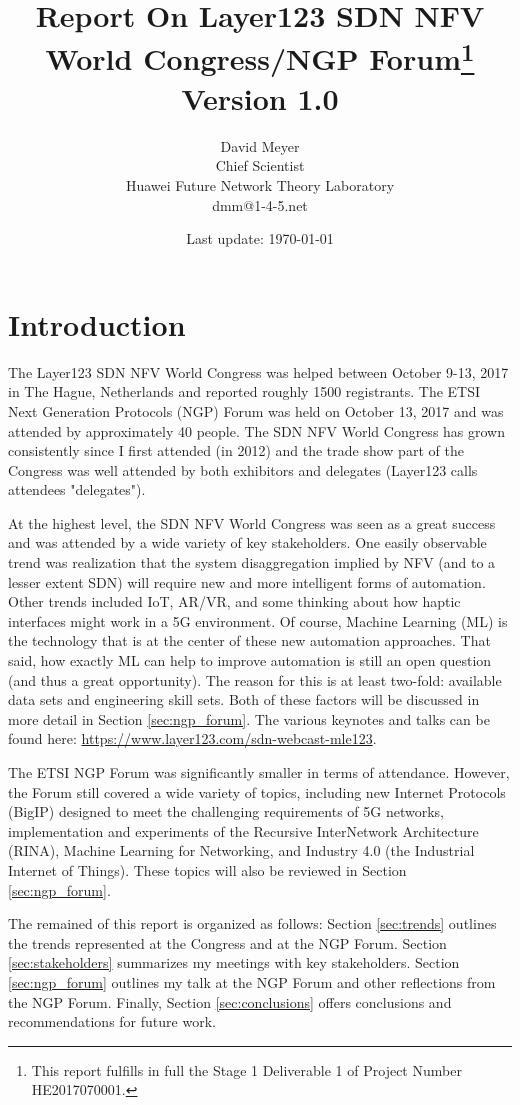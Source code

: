 \documentclass[11pt, oneside]{article}   	%
\title{Report On Layer123 SDN NFV World Congress/NGP Forum\footnote{This report fulfills in full the Stage 1 Deliverable 1 of Project Number HE2017070001.}
Version 1.0}
\author{David Meyer \\
Chief Scientist \\
Huawei Future Network Theory Laboratory \\
dmm@1-4-5.net}
\date{Last update: \today}							%
\begin{document}
\maketitle

\section{Introduction} 
\label{sec:intro}
The Layer123 SDN NFV World Congress was helped between October 9-13, 2017 in The Hague, Netherlands and reported roughly 1500 registrants. The ETSI Next Generation Protocols (NGP) Forum was held on October 13, 2017 and was attended by approximately 40 people. The SDN NFV World Congress has grown consistently since I first attended (in 2012) and the trade show part of the Congress was well attended by both exhibitors and delegates (Layer123 calls attendees "delegates").

\bigskip
\noindent
At the highest level, the SDN NFV World Congress was seen as a great success and was attended by a wide variety of key stakeholders.  One easily observable trend was realization that the system disaggregation implied by NFV (and to a lesser extent SDN) will require new and more intelligent forms of automation. Other trends included IoT, AR/VR, and some thinking about how haptic interfaces might work in a 5G environment. Of course, Machine Learning (ML) is the technology that is at the center of these new automation approaches. That said, how exactly ML can help to improve automation is still an open question (and thus a great opportunity). The reason for this is at least two-fold: available data sets and engineering skill sets. Both of these factors will be discussed in more detail in Section \ref{sec:ngp_forum}. The various keynotes and talks can be found here: \url{https://www.layer123.com/sdn-webcast-mle123}.

\bigskip
\noindent
The ETSI NGP Forum was significantly smaller in terms of attendance. However, the Forum still covered a wide variety of topics, including new Internet Protocols (BigIP) designed to meet the challenging requirements of 5G networks,  implementation and experiments of the Recursive InterNetwork Architecture (RINA), Machine Learning for Networking, and Industry 4.0 (the Industrial Internet of Things). These topics will also be reviewed in Section \ref{sec:ngp_forum}.


\bigskip
\noindent
The remained of this report is organized as follows: Section \ref{sec:trends} outlines the trends represented at the Congress and at the NGP Forum. Section \ref{sec:stakeholders} summarizes  my meetings with key stakeholders. Section \ref{sec:ngp_forum} outlines my talk at the NGP Forum and other reflections from the NGP Forum. Finally, Section \ref{sec:conclusions} offers conclusions and recommendations for future work.
\end{document}
